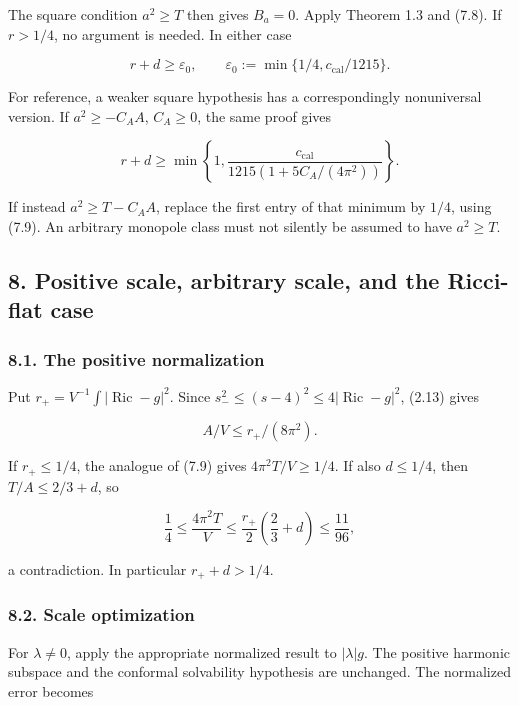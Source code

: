 \documentclass[
  11pt,
]{article}
\begin{document}
The square condition \(a^2\ge T\) then gives \(B_a=0\). Apply Theorem
1.3 and (7.8). If \(r>1/4\), no argument is needed. In either case

\[
       r+d\ge\varepsilon_0,
       \qquad \varepsilon_0:=\min\{1/4,c_{\mathrm{cal}}/1215\}.
 \tag{7.10}
\]

For reference, a weaker square hypothesis has a correspondingly
nonuniversal version. If \(a^2\ge-C_AA\), \(C_A\ge0\), the same proof
gives

\[
 r+d\ge\min\left\{1,
          \frac{c_{\mathrm{cal}}}{1215(1+5C_A/(4\pi^2))}\right\}.
 \tag{7.11}
\]

If instead \(a^2\ge T-C_AA\), replace the first entry of that minimum by
\(1/4\), using (7.9). An arbitrary monopole class must not silently be
assumed to have \(a^2\ge T\).

\hypertarget{positive-scale-arbitrary-scale-and-the-ricci-flat-case}{%
\subsection{8. Positive scale, arbitrary scale, and the Ricci-flat
case}\label{positive-scale-arbitrary-scale-and-the-ricci-flat-case}}

\hypertarget{the-positive-normalization}{%
\subsubsection{8.1. The positive
normalization}\label{the-positive-normalization}}

Put \(r_+=V^{-1}\int|\operatorname{Ric}-g|^2\). Since
\(s_-^2\le(s-4)^2\le4|\operatorname{Ric}-g|^2\), (2.13) gives

\[
                            A/V\le r_+/(8\pi^2).
\]

If \(r_+\le1/4\), the analogue of (7.9) gives \(4\pi^2T/V\ge1/4\). If
also \(d\le1/4\), then \(T/A\le2/3+d\), so

\[
  \frac14\le\frac{4\pi^2T}{V}
             \le\frac{r_+}{2}\left(\frac23+d\right)
             \le\frac{11}{96},
\]

a contradiction. In particular \(r_++d>1/4\).

\hypertarget{scale-optimization}{%
\subsubsection{8.2. Scale optimization}\label{scale-optimization}}

For \(\lambda\ne0\), apply the appropriate normalized result to
\(|\lambda|g\). The positive harmonic subspace and the conformal
solvability hypothesis are unchanged. The normalized error becomes
\end{document}

